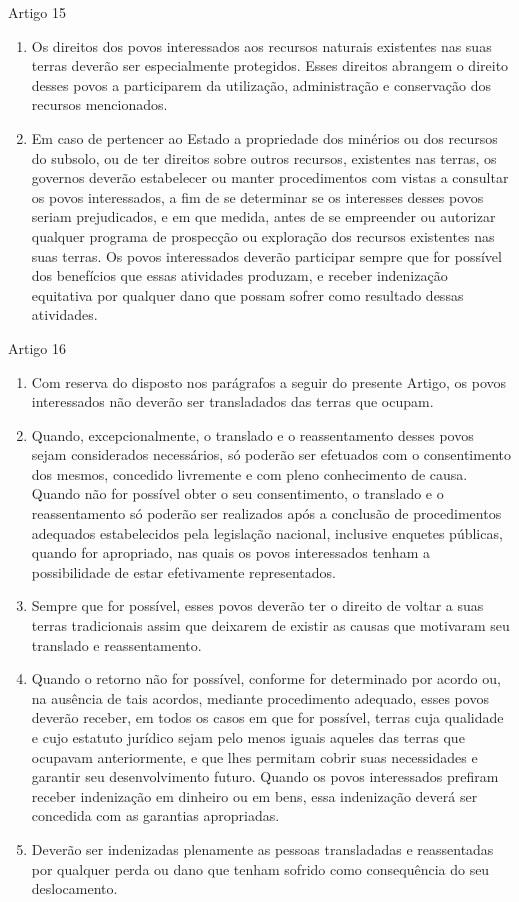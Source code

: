 \documentclass[
]{book}
\begin{document}
Artigo 15

\begin{enumerate}
\def\labelenumi{\arabic{enumi}.}
\item
  Os direitos dos povos interessados aos recursos naturais existentes nas suas terras deverão ser especialmente protegidos. Esses direitos abrangem o direito desses povos a participarem da utilização, administração e conservação dos recursos mencionados.
\item
  Em caso de pertencer ao Estado a propriedade dos minérios ou dos recursos do subsolo, ou de ter direitos sobre outros recursos, existentes nas terras, os governos deverão estabelecer ou manter procedimentos com vistas a consultar os povos interessados, a fim de se determinar se os interesses desses povos seriam prejudicados, e em que medida, antes de se empreender ou autorizar qualquer programa de prospecção ou exploração dos recursos existentes nas suas terras. Os povos interessados deverão participar sempre que for possível dos benefícios que essas atividades produzam, e receber indenização equitativa por qualquer dano que possam sofrer como resultado dessas atividades.
\end{enumerate}

Artigo 16

\begin{enumerate}
\def\labelenumi{\arabic{enumi}.}
\item
  Com reserva do disposto nos parágrafos a seguir do presente Artigo, os povos interessados não deverão ser transladados das terras que ocupam.
\item
  Quando, excepcionalmente, o translado e o reassentamento desses povos sejam considerados necessários, só poderão ser efetuados com o consentimento dos mesmos, concedido livremente e com pleno conhecimento de causa. Quando não for possível obter o seu consentimento, o translado e o reassentamento só poderão ser realizados após a conclusão de procedimentos adequados estabelecidos pela legislação nacional, inclusive enquetes públicas, quando for apropriado, nas quais os povos interessados tenham a possibilidade de estar efetivamente representados.
\item
  Sempre que for possível, esses povos deverão ter o direito de voltar a suas terras tradicionais assim que deixarem de existir as causas que motivaram seu translado e reassentamento.
\item
  Quando o retorno não for possível, conforme for determinado por acordo ou, na ausência de tais acordos, mediante procedimento adequado, esses povos deverão receber, em todos os casos em que for possível, terras cuja qualidade e cujo estatuto jurídico sejam pelo menos iguais aqueles das terras que ocupavam anteriormente, e que lhes permitam cobrir suas necessidades e garantir seu desenvolvimento futuro. Quando os povos interessados prefiram receber indenização em dinheiro ou em bens, essa indenização deverá ser concedida com as garantias apropriadas.
\item
  Deverão ser indenizadas plenamente as pessoas transladadas e reassentadas por qualquer perda ou dano que tenham sofrido como consequência do seu deslocamento.
\end{enumerate}
\end{document}
